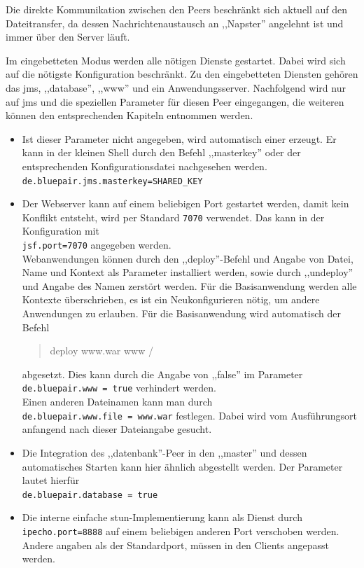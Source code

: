 \documentclass[oneside, ngerman, toc=bibliography,bibliography=totoc,listof=entryprefix, open=right,numbers=noenddot,fontsize=12pt]{scrbook}
\begin{document}
Die direkte Kommunikation zwischen den Peers beschränkt sich aktuell auf den Dateitransfer, da dessen Nachrichtenaustausch an ,,Napster'' angelehnt ist und immer über den Server läuft.


Im eingebetteten Modus werden alle nötigen Dienste gestartet. Dabei wird sich auf die nötigste Konfiguration beschränkt. Zu den eingebetteten Diensten gehören das \acrshort{jms}, ,,database'', ,,www'' und ein Anwendungsserver. Nachfolgend wird nur auf \acrshort{jms} und die speziellen Parameter für diesen Peer eingegangen, die weiteren können den entsprechenden Kapiteln entnommen werden.

\begin{itemize}
    
    \item 
    Ist dieser Parameter nicht angegeben, wird automatisch einer erzeugt. Er kann in der kleinen Shell durch den Befehl ,,masterkey'' oder der entsprechenden Konfigurationsdatei nachgesehen werden.\\
    \verb|de.bluepair.jms.masterkey=SHARED_KEY|
    \item Der Webserver kann auf einem beliebigen Port gestartet werden, damit kein Konflikt entsteht, wird per Standard \verb|7070| verwendet. Das kann in der Konfiguration mit \\
    \verb|jsf.port=7070| angegeben werden. \\
    Webanwendungen können durch den ,,deploy''-Befehl und Angabe von Datei, Name und Kontext als Parameter installiert werden, sowie durch ,,undeploy'' und Angabe des Namen zerstört werden.
    Für die Basisanwendung werden alle Kontexte überschrieben, es ist ein Neukonfigurieren nötig, um andere Anwendungen zu erlauben. Für die Basisanwendung wird automatisch der Befehl\\
    \begin{quote}
        deploy www.war www /
    \end{quote}
     abgesetzt. Dies kann durch die Angabe von ,,false'' im Parameter\\
     \verb|de.bluepair.www = true| verhindert werden.\\ Einen anderen Dateinamen kann man durch \\
     \verb|de.bluepair.www.file = www.war| festlegen. Dabei wird vom Ausführungsort anfangend nach dieser Dateiangabe gesucht.
     
     \item Die Integration des ,,datenbank''-Peer in den ,,master'' und dessen automatisches Starten kann hier ähnlich abgestellt werden. Der Parameter lautet hierfür\\
     \verb|de.bluepair.database = true|
     
     
     \item Die interne einfache \acrshort{stun}-Implementierung kann als Dienst durch \\
     \verb|ipecho.port=8888| auf einem beliebigen anderen Port verschoben werden. Andere angaben als der Standardport, müssen in den Clients angepasst werden.
      
     
    
\end{itemize}
\end{document}
